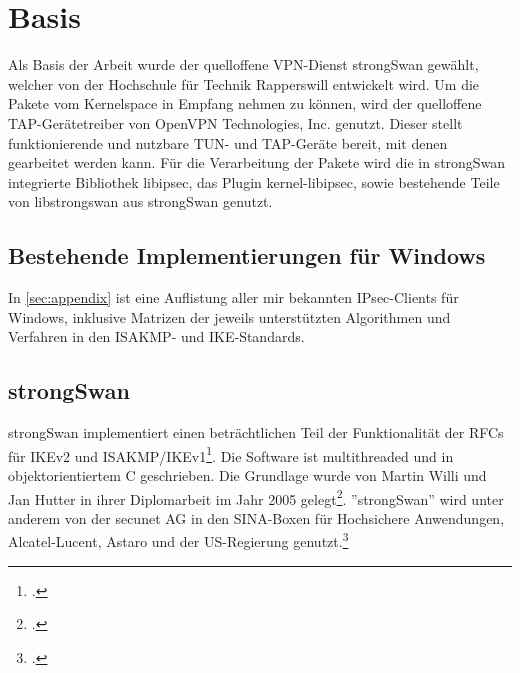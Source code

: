 


\section{Basis}
Als Basis der Arbeit wurde der quelloffene VPN-Dienst strongSwan gewählt,
welcher von der Hochschule für Technik Rapperswill entwickelt wird.
Um die Pakete vom Kernelspace in Empfang nehmen zu können, wird der quelloffene
TAP-Gerätetreiber von OpenVPN Technologies, Inc. genutzt. Dieser stellt funktionierende
und nutzbare TUN- und TAP-Geräte bereit, mit denen gearbeitet werden kann.
Für die Verarbeitung der Pakete wird die in strongSwan integrierte Bibliothek libipsec,
das Plugin kernel-libipsec, sowie bestehende Teile von libstrongswan
aus strongSwan genutzt.

\subsection{Bestehende Implementierungen für Windows}

In \autoref{sec:appendix} ist eine Auflistung aller mir bekannten IPsec-Clients für Windows,
inklusive Matrizen der jeweils unterstützten Algorithmen und Verfahren in den ISAKMP-
und IKE-Standards.

\subsection{strongSwan}
\label{ch:strongswan}
strongSwan implementiert einen beträchtlichen Teil der Funktionalität der \acp{RFC} für IKEv2 und ISAKMP/IKEv1\footcite{_ipsecstandards_2016}.
Die Software ist multithreaded und in objektorientiertem C geschrieben.
Die Grundlage wurde von Martin Willi und Jan Hutter in ihrer Diplomarbeit im Jahr 2005 gelegt\footcite[][]{jan_hutter_strongswan_2005}.
''strongSwan'' wird unter anderem von der secunet AG in den SINA-Boxen für Hochsichere Anwendungen, Alcatel-Lucent, Astaro und
der US-Regierung genutzt.\footcite[][Folie 8]{andreas_steffen_strongswan_2011}
